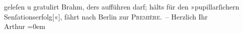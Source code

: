 \begin{ledgroupsized}[t]{13cm}
               geleſen u gratulirt Brahm, ders aufführen darf;
               hälts für den »pupillarſichern Senſationserfolg{[}«{]}, fährt nach Berlin zur \textsc{Première}. –\pend
           \pstart
           Herzlich Ihr{\\[\baselineskip]}\spacefill\mbox{Arthur}\pend
           \leftskip=0em{}\endnumbering{}\end{ledgroupsized}  \newcommand{\dateiname}{L00586}\newcommand{\titel}{Arthur Schnitzler an Richard Beer-Hofmann, 7. 9. 1896}\newcommand{\editorInnen}{Martin Anton Müller und Gerd-Hermann Susen}
      